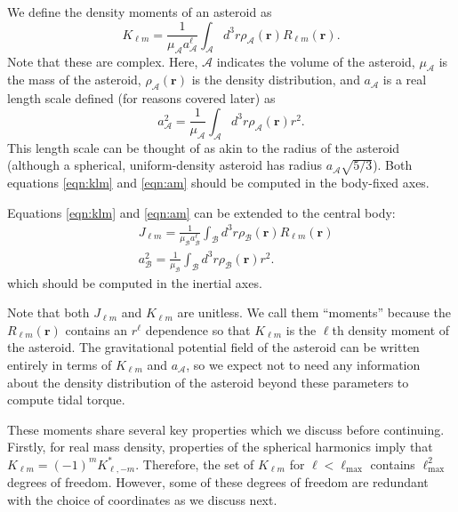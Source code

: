 \documentclass[fleqn,usenatbib]{mnras}
\begin{document}
We define the density moments of an asteroid as
\begin{equation}
  K_{\ell m} = \frac{1}{\mu_\mathcal{A} a_\mathcal{A}^\ell} \int_\mathcal{A} d^3 r \rho_\mathcal{A}(\bm r) R_{\ell m}(\bm r).
  \label{eqn:klm}
\end{equation}
Note that these are complex. Here, $\mathcal{A}$ indicates the volume of the asteroid, $\mu_\mathcal{A}$ is the mass of the asteroid, $\rho_\mathcal{A}(\bm r)$ is the density distribution, and $a_\mathcal{A}$ is a real length scale defined (for reasons covered later) as 
\begin{equation}
  a_\mathcal{A}^2 = \frac{1}{\mu_\mathcal{A}} \int_\mathcal{A} d^3 r \rho_\mathcal{A}(\bm r) r^2.
  \label{eqn:am}
\end{equation}
This length scale can be thought of as akin to the radius of the asteroid (although a spherical, uniform-density asteroid has radius $a_\mathcal{A}\sqrt{5/3} $). Both equations \ref{eqn:klm} and \ref{eqn:am} should be computed in the body-fixed axes.

Equations \ref{eqn:klm} and \ref{eqn:am} can be extended to the central body:
\begin{equation}
  \begin{split}
    &J_{\ell m} = \frac{1}{\mu_\mathcal{B} a_\mathcal{B}^\ell} \int_\mathcal{B} d^3 r \rho_\mathcal{B}(\bm r) R_{\ell m}(\bm r)\\
    &a_\mathcal{B}^2 = \frac{1}{\mu_\mathcal{B}} \int_\mathcal{B} d^3 r \rho_\mathcal{B}(\bm r) r^2.
  \end{split}
  \label{eqn:jlm}
\end{equation}
which should be computed in the inertial axes.

Note that both $J_{\ell m}$ and $K_{\ell m}$ are unitless. We call them ``moments'' because the $R_{\ell m}(\bm r)$ contains an $r^\ell$ dependence so that $K_{\ell m}$ is the $\ell$th density moment of the asteroid. The gravitational potential field of the asteroid can be written entirely in terms of $K_{\ell m}$ and $a_\mathcal{A}$, so we expect not to need any information about the density distribution of the asteroid beyond these parameters to compute tidal torque.

These moments share several key properties which we discuss before continuing. Firstly, for real mass density, properties of the spherical harmonics imply that $K_{\ell m} = (-1)^m K_{\ell, -m}^*$. Therefore, the set of $K_{\ell m}$ for $\ell < \ell_\text{max}$ contains $\ell_\text{max}^2$ degrees of freedom. However, some of these degrees of freedom are redundant with the choice of coordinates as we discuss next.
\end{document}
